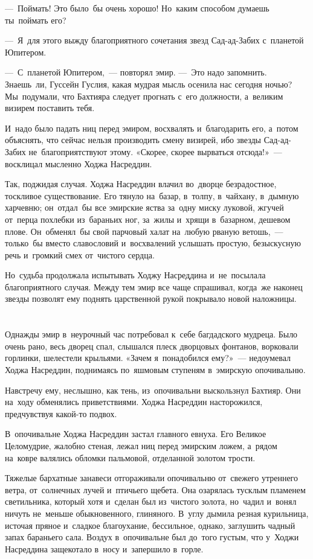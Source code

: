 \documentclass[12pt,a4paper]{book}
\begin{document}
—~Поймать! Это было~бы очень хорошо! Но~каким способом думаешь ты~поймать его?

—~Я~для этого выжду благоприятного сочетания звезд Сад-ад-Забих с~планетой Юпитером.

—~С~планетой Юпитером,~— повторял эмир. —~Это надо запомнить. Знаешь~ли, Гуссейн Гуслия, какая мудрая мысль осенила нас сегодня ночью? Мы~подумали, что Бахтияра следует прогнать с~его должности, а~великим визирем поставить тебя.

И~надо было падать ниц перед эмиром, восхвалять и~благодарить его, а~потом объяснять, что сейчас нельзя производить смену визирей, ибо звезды Сад-ад-Забих не~благоприятствуют этому. «Скорее, скорее вырваться отсюда!»~— восклицал мысленно Ходжа Насреддин.

Так, поджидая случая. Ходжа Насреддин влачил во~дворце безрадостное, тоскливое существование. Его тянуло на~базар, в~толпу, в~чайхану, в~дымную харчевню; он~отдал~бы все эмирские яства за~одну миску луковой, жгучей от~перца похлебки из~бараньих ног, за~жилы и~хрящи в~базарном, дешевом плове. Он~обменял~бы свой парчовый халат на~любую рваную ветошь,~— только~бы вместо славословий и~восхвалений услышать простую, безыскусную речь и~громкий смех от~чистого сердца.

Но~судьба продолжала испытывать Ходжу Насреддина и~не~посылала благоприятного случая. Между тем эмир все чаще спрашивал, когда~же наконец звезды позволят ему поднять царственной рукой покрывало новой наложницы.


\chapter{}

Однажды эмир в~неурочный час потребовал к~себе багдадского мудреца. Было очень рано, весь дворец спал, слышался плеск дворцовых фонтанов, ворковали горлинки, шелестели крыльями. «Зачем я~понадобился ему?»~— недоумевал Ходжа Насреддин, поднимаясь по~яшмовым ступеням в~эмирскую опочивальню.

Навстречу ему, неслышно, как тень, из~опочивальни выскользнул Бахтияр. Они на~ходу обменялись приветствиями. Ходжа Насреддин насторожился, предчувствуя какой-то подвох.

В~опочивальне Ходжа Насреддин застал главного евнуха. Его Великое Целомудрие, жалобно стеная, лежал ниц перед эмирским ложем, а~рядом на~ковре валялись обломки пальмовой, отделанной золотом трости.

Тяжелые бархатные занавеси отгораживали опочивальню от~свежего утреннего ветра, от~солнечных лучей и~птичьего щебета. Она озарялась тусклым пламенем светильника, который хотя и~сделан был из~чистого золота, но~чадил и~вонял ничуть не~меньше обыкновенного, глиняного. В~углу дымила резная курильница, источая пряное и~сладкое благоухание, бессильное, однако, заглушить чадный запах бараньего сала. Воздух в~опочивальне был до~того густым, что у~Ходжи Насреддина защекотало в~носу и~запершило в~горле.
\end{document}
